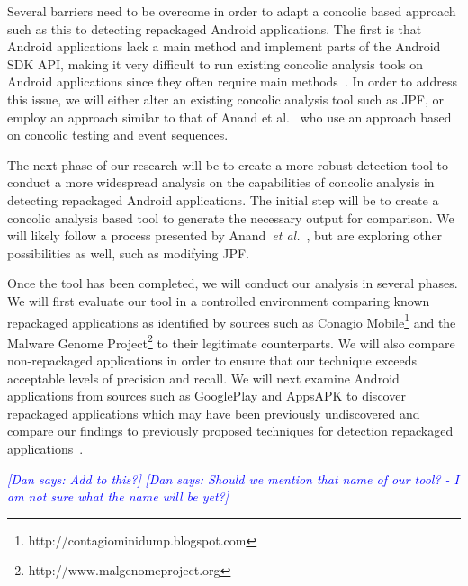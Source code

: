 \documentclass{sig-alternate}
\newcommand{\dan}[1]{\textcolor{blue}{{\it [Dan says: #1]}}}
\begin{document}
Several barriers need to be overcome in order to adapt a concolic based approach such as this to detecting repackaged Android applications. The first is that Android applications lack a main method and implement parts of the Android SDK API, making it very difficult to run existing concolic analysis tools on Android applications since they often require main methods~\cite{Anand:2012:ACT:2393596.2393666}. In order to address this issue, we will either alter an existing concolic analysis tool such as JPF, or employ an approach similar to that of Anand et al.~\cite{Anand:2012:ACT:2393596.2393666} who use an approach based on concolic testing and event sequences.




The next phase of our research will be to create a more robust detection tool to conduct a more widespread analysis on the capabilities of concolic analysis in detecting repackaged Android applications. The initial step will be to create a concolic analysis based tool to generate the necessary output for comparison. We will likely follow a process presented by Anand~\emph{et al.}~\cite{Anand:2012:ACT:2393596.2393666}, but are exploring other possibilities as well, such as modifying JPF.






%


Once the tool has been completed, we will conduct our analysis in several phases. We will first evaluate our tool in a controlled environment comparing known repackaged applications as identified by sources such as Conagio Mobile\footnote{http://contagiominidump.blogspot.com} and the Malware Genome Project\footnote{http://www.malgenomeproject.org} to their legitimate counterparts. We will also compare non-repackaged applications in order to ensure that our technique exceeds acceptable levels of precision and recall. We will next examine Android applications from sources such as GooglePlay and AppsAPK to discover repackaged applications which may have been previously undiscovered and compare our findings to previously proposed techniques for detection repackaged applications~\cite{Chen:2014:AAS:2568225.2568286, Zhou:2012:DRS:2133601.2133640,Zhang:2014:VTO:2627393.2627395}.



\dan{Add to this?}
\dan{Should we mention that name of our tool? - I am not sure what the name will be yet?}




\end{document}
